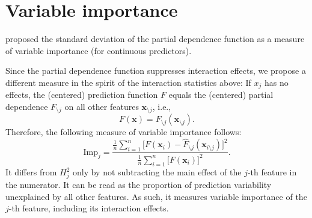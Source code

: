 \documentclass[]{article}
\begin{document}
\section{Variable importance}

\cite{greenwell2018} proposed the standard deviation of the partial dependence function as a measure of variable importance (for continuous predictors). 

Since the partial dependence function suppresses interaction effects, we propose a different measure in the spirit of the interaction statistics above: If $x_j$ has no effects, the (centered) prediction function $F$ equals the (centered) partial dependence $F_{\setminus j}$ on all other features $\mathbf{x}_{\setminus j}$, i.e.,
$$
	F(\mathbf{x}) = F_{\setminus j}(\mathbf{x}_{\setminus j}).
$$
Therefore, the following measure of variable importance follows:
$$
	\textrm{Imp}_j = \frac{\frac{1}{n} \sum_{i = 1}^n\big[F(\mathbf{x}_i) - \hat F_{\setminus j}(\mathbf{x}_{i\setminus j})\big]^2}{\frac{1}{n} \sum_{i = 1}^n\big[F(\mathbf{x}_i)\big]^2}.
$$
It differs from $H^2_j$ only by not subtracting the main effect of the $j$-th feature in the numerator. It can be read as the proportion of prediction variability unexplained by all other features. As such, it measures variable importance of the $j$-th feature, including its interaction effects. 



\end{document}
